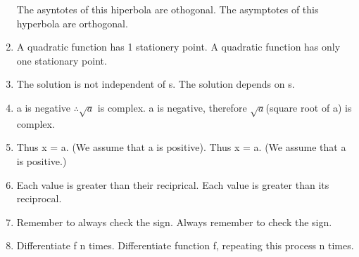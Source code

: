 \documentclass[11pt]{article}
\begin{document}
\begin{enumerate}
The asyntotes of this hiperbola are othogonal. \textrightarrow \hspace*{0.25cm} The asymptotes of this hyperbola are orthogonal.
\item
A quadratic function has 1 stationery point. \textrightarrow \hspace*{0.25cm} A quadratic function has only one stationary point.
\item
The solution is not independent of s. \textrightarrow \hspace*{0.25cm} The solution depends on s.
\item
a is negative $\therefore\sqrt{a}$ is complex. \textrightarrow \hspace*{0.25cm} a is negative, therefore $\sqrt{a}$(square root of a) is complex.
\item
Thus x = a. (We assume that a is positive). \textrightarrow \hspace*{0.25cm} Thus x = a. (We assume that a is positive.)
\item
Each value is greater than their reciprical. \textrightarrow \hspace*{0.25cm} Each value is greater than its reciprocal.
\item
Remember to always check the sign. \textrightarrow \hspace*{0.25cm} Always remember to check the sign.
\item
Differentiate f n times. \textrightarrow \hspace*{0.25cm}  	Differentiate function f, repeating this process n times.

\end{enumerate}
\end{document}

